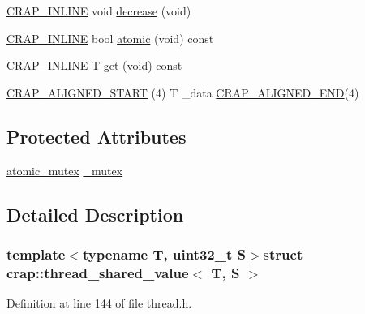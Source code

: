 \begin{DoxyCompactItemize}
\item 
\hyperlink{config__x86_8h_a5a40526b8d842e7ff731509998bb0f1c}{C\+R\+A\+P\+\_\+\+I\+N\+L\+I\+N\+E} void \hyperlink{structcrap_1_1thread__shared__value_ada00d8a9e21133cb37781f334aac1949}{decrease} (void)
\item 
\hyperlink{config__x86_8h_a5a40526b8d842e7ff731509998bb0f1c}{C\+R\+A\+P\+\_\+\+I\+N\+L\+I\+N\+E} bool \hyperlink{structcrap_1_1thread__shared__value_a00d461793654a558bf17d1544836359a}{atomic} (void) const 
\item 
\hyperlink{config__x86_8h_a5a40526b8d842e7ff731509998bb0f1c}{C\+R\+A\+P\+\_\+\+I\+N\+L\+I\+N\+E} T \hyperlink{structcrap_1_1thread__shared__value_afd8d6a1b90b3062d1a58cfb9991362e5}{get} (void) const 
\item 
\hyperlink{structcrap_1_1thread__shared__value_a38c1e0ba0f3ca0cbc8958ac175d7a8f8}{C\+R\+A\+P\+\_\+\+A\+L\+I\+G\+N\+E\+D\+\_\+\+S\+T\+A\+R\+T} (4) T \+\_\+data \hyperlink{namespacecrap_a40f2b73ae646e41f3534198d19fbb188}{C\+R\+A\+P\+\_\+\+A\+L\+I\+G\+N\+E\+D\+\_\+\+E\+N\+D}(4)
\end{DoxyCompactItemize}
\subsection*{Protected Attributes}
\begin{DoxyCompactItemize}
\item 
\hyperlink{structcrap_1_1atomic__mutex}{atomic\+\_\+mutex} \hyperlink{structcrap_1_1thread__shared__value_aead78950e96504db162b4bf06628f4f5}{\+\_\+mutex}
\end{DoxyCompactItemize}


\subsection{Detailed Description}
\subsubsection*{template$<$typename T, uint32\+\_\+t S$>$struct crap\+::thread\+\_\+shared\+\_\+value$<$ T, S $>$}



Definition at line 144 of file thread.\+h.



